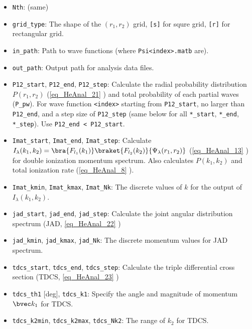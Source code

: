 
\begin{itemize}
\item \verb`Nth`: (same)
\item \verb`grid_type`: The shape of the $(r_1,r_2)$ grid, \verb`[s]` for squre grid, \verb`[r]` for rectangular grid.
\item \verb`in_path`: Path to wave functions (where \verb`Psi<index>.matb` are).
\item \verb`out_path`: Output path for analysis data files.

\item \verb`P12_start`, \verb`P12_end`, \verb`P12_step`: Calculate the radial probability distribution $P(r_1, r_2)$ (\autoref{eq_HeAnal_21} ) and total probability of each partial waves (\verb`P_pw`). For wave function \verb`<index>` starting from \verb`P12_start`, no larger than \verb`P12_end`, and a step size of \verb`P12_step` (same below for all \verb`*_start`, \verb`*_end`, \verb`*_step`). Use \verb`P12_end < P12_start`.

\item \verb`Imat_start`, \verb`Imat_end`, \verb`Imat_step`: Calculate $I_\lambda(k_1, k_2) = \bra{F_{l_1}(k_1)}\braket{F_{l_2}(k_2)}{\Psi_\lambda(r_1,r_2)}$ (\autoref{eq_HeAnal_13} ) for double ionization momentum spectrum. Also calculates $P(k_1,k_2)$ and total ionization rate (\autoref{eq_HeAnal_8} ).
\item \verb`Imat_kmin`, \verb`Imat_kmax`, \verb`Imat_Nk`: The discrete values of $k$ for the output of $I_\lambda(k_1, k_2)$.
\item \verb`jad_start`, \verb`jad_end`, \verb`jad_step`: Calculate the joint angular distribution spectrum (JAD, \autoref{eq_HeAnal_22} )
\item \verb`jad_kmin`, \verb`jad_kmax`, \verb`jad_Nk`: The discrete momentum values for JAD spectrum.

\item \verb`tdcs_start`, \verb`tdcs_end`, \verb`tdcs_step`: Calculate the triple differential cross section (TDCS, \autoref{eq_HeAnal_23} )
\item \verb`tdcs_th1` [deg], \verb`tdcs_k1`: Specify the angle and magnitude of momentum $\bvec k_1$ for TDCS.
\item \verb`tdcs_k2min`, \verb`tdcs_k2max`, \verb`tdcs_Nk2`: The range of $k_2$ for TDCS.


\end{itemize}
